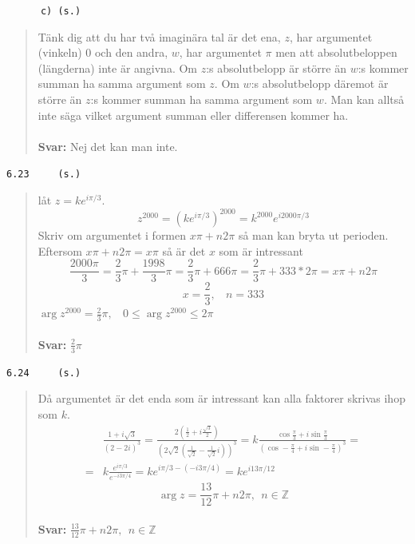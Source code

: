 \documentclass[a4paper]{article}
\newcommand{\tskcol}[1]{\textcolor{tskcol}{#1}}
\begin{document}
	\texttt{\tskcol{~~~~~~c) (s.)}}
	\begin{quotation}
		\noindent
		Tänk dig att du har två imaginära tal är det ena, $z$, har argumentet (vinkeln) $0$ och den andra, $w$, har argumentet $\pi$ men att absolutbeloppen (längderna) inte är angivna. Om $z$:s absolutbelopp är större än $w$:s kommer summan ha samma argument som $z$. Om $w$:s absolutbelopp däremot är större än $z$:s kommer summan ha samma argument som $w$. Man kan alltså inte säga vilket argument summan eller differensen kommer ha.
		\\ \\
		\textbf{Svar:} Nej det kan man inte.
	\end{quotation}
	
	\texttt{\tskcol{6.23~~~~ (s.)}}
	\begin{quotation}
		\noindent
		låt $z=ke^{i\pi/3}$.
		\[z^{2000}=
		(ke^{i\pi/3})^{2000}=
		k^{2000}e^{i2000\pi/3}\]
		Skriv om argumentet i formen $x\pi+n2\pi$ så man kan bryta ut perioden. Eftersom $x\pi+n2\pi=x\pi$ så är det $x$ som är intressant
		\[\frac{2000\pi}{3}=
		\frac{2}{3}\pi+\frac{1998}{3}\pi=
		\frac{2}{3}\pi+666\pi=
		\frac{2}{3}\pi+333*2\pi=x\pi+n2\pi\]
		\[x=\frac{2}{3},~~~~ n=333\]
		$\arg z^{2000}= \frac{2}{3}\pi,~~~~0\le \arg z^{2000} \le 2\pi$
		\\ \\
		\textbf{Svar:} $\frac{2}{3}\pi$
	\end{quotation}
	
	\texttt{\tskcol{6.24~~~~ (s.)}}
	\begin{quotation}
		\noindent
		Då argumentet är det enda som är intressant kan alla faktorer skrivas ihop som $k$.
		\begin{align*}
		&\frac{1+i\sqrt{3}}{(2-2i)^3}=
		\frac{2(\frac{1}{2}+i\frac{\sqrt{3}}{2})}{(2\sqrt{2}(\frac{1}{\sqrt{2}}-\frac{1}{\sqrt{2}}i))^3}=
		k\frac{\cos\frac{\pi}{3}+i\sin\frac{\pi}{3}}{(\cos-\frac{\pi}{4}+i\sin-\frac{\pi}{4})^3}= \\ =
		&k\frac{e^{i\pi/3}}{e^{-i3\pi/4}}=
		ke^{i\pi/3-(-i3\pi/4)}=
		ke^{i13\pi/12}
		\end{align*}
		\[\arg z = \frac{13}{12}\pi+n2\pi, ~~ n\in\mathbb{Z}\]
		\\
		\textbf{Svar:} $\frac{13}{12}\pi+n2\pi, ~~ n\in\mathbb{Z}$
	\end{quotation}
	
\end{document}
